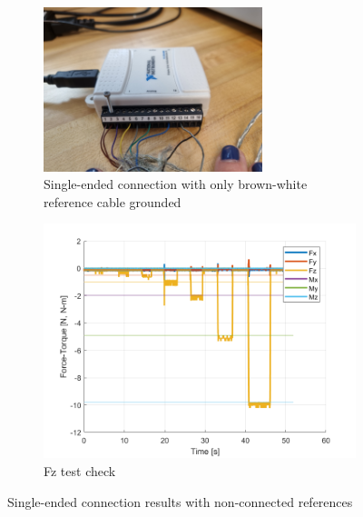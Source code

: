 \documentclass[a4paper]{article}
\begin{document}
{\begin{figure}[h!]
	\begin{subfigure}{.5\textwidth}
		\centering
		\includegraphics[width=0.7\textwidth,angle=180]{NIUSB6008_ATIMini40Connection.jpg}
		\caption{Single-ended connection with only brown-white reference cable grounded}
		\label{fig:NIUSB6008_ATIMini40Connection}
	\end{subfigure}%
	\begin{subfigure}{.5\textwidth}
		\centering
		\includegraphics[width=.8\linewidth]{Forces_check50Hz.png}
		\caption{Fz test check}
		\label{fig:Forces_check50Hz}
	\end{subfigure}
	\caption{Single-ended connection results with non-connected references}
	\label{fig:test1}
\end{figure} 

}
\end{document}
